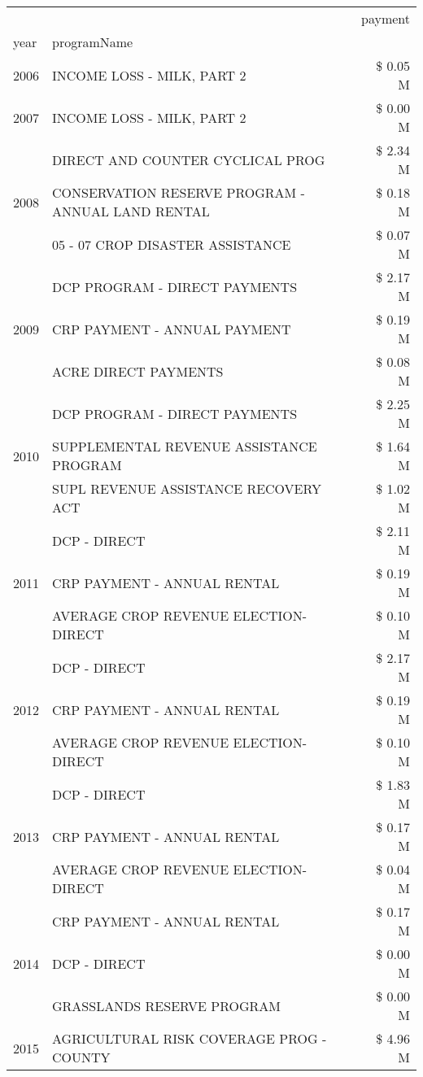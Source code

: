 \begin{tabular}{llr}
\toprule
 &  & payment \\
year & programName &  \\
\midrule
2006 & INCOME LOSS - MILK, PART 2 & \$ 0.05 M \\
\cline{1-3}
2007 & INCOME LOSS - MILK, PART 2 & \$ 0.00 M \\
\cline{1-3}
\multirow[t]{3}{*}{2008} & DIRECT AND COUNTER CYCLICAL PROG & \$ 2.34 M \\
 & CONSERVATION RESERVE PROGRAM - ANNUAL LAND RENTAL & \$ 0.18 M \\
 & 05 - 07 CROP DISASTER ASSISTANCE & \$ 0.07 M \\
\cline{1-3}
\multirow[t]{3}{*}{2009} & DCP PROGRAM - DIRECT PAYMENTS & \$ 2.17 M \\
 & CRP PAYMENT - ANNUAL PAYMENT & \$ 0.19 M \\
 & ACRE DIRECT PAYMENTS & \$ 0.08 M \\
\cline{1-3}
\multirow[t]{3}{*}{2010} & DCP PROGRAM - DIRECT PAYMENTS & \$ 2.25 M \\
 & SUPPLEMENTAL REVENUE ASSISTANCE PROGRAM & \$ 1.64 M \\
 & SUPL REVENUE ASSISTANCE RECOVERY ACT & \$ 1.02 M \\
\cline{1-3}
\multirow[t]{3}{*}{2011} & DCP - DIRECT & \$ 2.11 M \\
 & CRP PAYMENT - ANNUAL RENTAL & \$ 0.19 M \\
 & AVERAGE CROP REVENUE ELECTION-DIRECT & \$ 0.10 M \\
\cline{1-3}
\multirow[t]{3}{*}{2012} & DCP - DIRECT & \$ 2.17 M \\
 & CRP PAYMENT - ANNUAL RENTAL & \$ 0.19 M \\
 & AVERAGE CROP REVENUE ELECTION-DIRECT & \$ 0.10 M \\
\cline{1-3}
\multirow[t]{3}{*}{2013} & DCP - DIRECT & \$ 1.83 M \\
 & CRP PAYMENT - ANNUAL RENTAL & \$ 0.17 M \\
 & AVERAGE CROP REVENUE ELECTION-DIRECT & \$ 0.04 M \\
\cline{1-3}
\multirow[t]{3}{*}{2014} & CRP PAYMENT - ANNUAL RENTAL & \$ 0.17 M \\
 & DCP - DIRECT & \$ 0.00 M \\
 & GRASSLANDS RESERVE PROGRAM & \$ 0.00 M \\
\cline{1-3}
\multirow[t]{3}{*}{2015} & AGRICULTURAL RISK COVERAGE PROG - COUNTY & \$ 4.96 M \\

\end{tabular}
